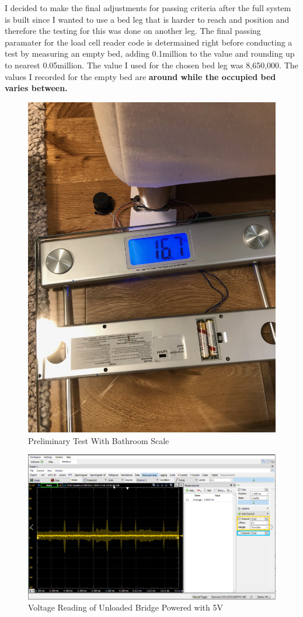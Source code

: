 \documentclass[11pt]{article}
\begin{document}
I decided to make the final adjustments for passing criteria after the full system is built since I wanted to use a bed leg that is harder to reach and position and therefore the testing for this was done on another leg.
The final passing paramater for the load cell reader code is determained right before conducting a test by measuring an empty bed, adding 0.1million to the value and rounding up to nearest 0.05million.  
The value I used for the chosen bed leg was 8,650,000.
The values I recorded for the empty bed are \textbf{around while the occupied bed varies between.}
 
\begin{figure}[H]
	\centering
	\includegraphics[width = 0.5\linewidth, angle = 270]{preliminarytest}
	\caption{Preliminary Test With Bathroom Scale}
	\label{fig:preliminary}
\end{figure}
\begin{figure}[H]
	\centering
	\includegraphics[width = \linewidth]{emptyBridgeReading}
	\caption{Voltage Reading of Unloaded Bridge Powered with 5V}
	\label{fig:bridgevoltage}
\end{figure}
\newpage
\end{document}
